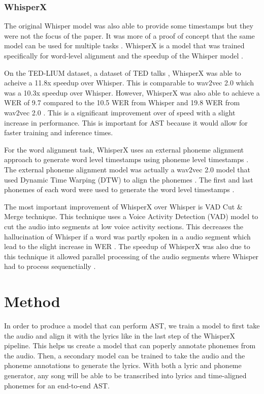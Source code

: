 \documentclass[letterpaper, 12pt]{article}
\begin{document}
\begin{multicols*}{2}
\subsubsection{WhisperX}
The original Whisper model was also able to provide some timestamps but they were not the focus of
the paper. It was more of a proof of concept that the same model can be used for multiple tasks
\citep{whisper}. WhisperX is a model that was trained specifically for word-level alignment and
the speedup of the Whisper model \citep{whisperX}.

On the TED-LIUM dataset, a dataset of TED talks \citep{tedlium3}, WhisperX was able to acheive a
11.8x speedup over Whisper. This is comparable to wav2vec 2.0 which was a 10.3x speedup over
Whisper. However, WhisperX was also able to achieve a WER of 9.7 compared to the 10.5 WER from
Whisper and 19.8 WER from wav2vec 2.0 \citep{whisperX}. This is a significant improvement over
of speed with a slight increase in performance. This is important for AST because it would allow
for faster training and inference times.

For the word alignment task, WhisperX uses an external phoneme alignment approach to generate
word level timestamps using phoneme level timestamps \citep{whisperX}. The external phoneme
alignment model was actually a wav2vec 2.0 model that used Dynamic Time Warping (DTW) \citep{DTW}
to align the phonemes \citep{whisperX}. The first and last phonemes of each word were used to
generate the word level timestamps \citep{whisperX}.

The most important improvement of WhisperX over Whisper is VAD Cut \& Merge technique. This
technique uses a Voice Activity Detection (VAD) model to cut the audio into segments at low voice
activity sections. This decreases the hallucination of Whisper if a word was partly spoken in a
audio segment which lead to the slight increase in WER \citep{whisperX}. The speedup of WhisperX
was also due to this technique it allowed parallel processing of the audio segments where
Whisper had to process sequenctially \citep{whisperX}.


\section{Method}
In order to produce a model that can perform AST, we train a model to first take the audio and align
it with the lyrics like in the last step of the WhisperX pipeline. This helps us create a model that
can poperly annotate phonemes from the audio. Then, a secondary model can be trained to take the
audio and the phoneme annotations to generate the lyrics. With both a lyric and phoneme generator,
any song will be able to be transcribed into lyrics and time-aligned phonemes for an end-to-end AST.


\end{multicols*}
\end{document}
